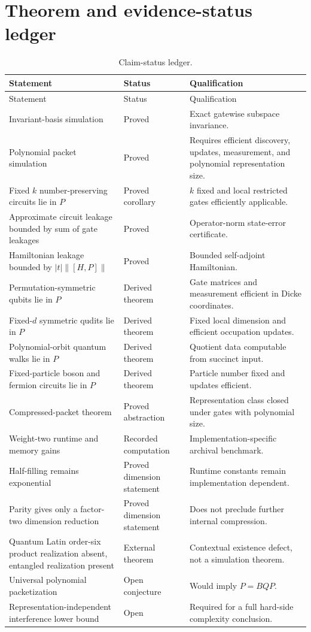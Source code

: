 \chapter{Theorem and evidence-status ledger}
\label{app:status}

\begin{longtable}{@{}L{.31\textwidth}L{.16\textwidth}L{.43\textwidth}@{}}
\caption{Claim-status ledger.}\\
\toprule
Statement & Status & Qualification\\
\midrule
\endfirsthead
\toprule
Statement & Status & Qualification\\
\midrule
\endhead
Invariant-basis simulation & Proved & Exact gatewise subspace invariance.\\
Polynomial packet simulation & Proved & Requires efficient discovery, updates, measurement, and polynomial representation size.\\
Fixed $k$ number-preserving circuits lie in $P$ & Proved corollary & $k$ fixed and local restricted gates efficiently applicable.\\
Approximate circuit leakage bounded by sum of gate leakages & Proved & Operator-norm state-error certificate.\\
Hamiltonian leakage bounded by $|t|\|[H,P]\|$ & Proved & Bounded self-adjoint Hamiltonian.\\
Permutation-symmetric qubits lie in $P$ & Derived theorem & Gate matrices and measurement efficient in Dicke coordinates.\\
Fixed-$d$ symmetric qudits lie in $P$ & Derived theorem & Fixed local dimension and efficient occupation updates.\\
Polynomial-orbit quantum walks lie in $P$ & Derived theorem & Quotient data computable from succinct input.\\
Fixed-particle boson and fermion circuits lie in $P$ & Derived theorem & Particle number fixed and updates efficient.\\
Compressed-packet theorem & Proved abstraction & Representation class closed under gates with polynomial size.\\
Weight-two runtime and memory gains & Recorded computation & Implementation-specific archival benchmark.\\
Half-filling remains exponential & Proved dimension statement & Runtime constants remain implementation dependent.\\
Parity gives only a factor-two dimension reduction & Proved dimension statement & Does not preclude further internal compression.\\
Quantum Latin order-six product realization absent, entangled realization present & External theorem & Contextual existence defect, not a simulation theorem.\\
Universal polynomial packetization & Open conjecture & Would imply $P=BQP$.\\
Representation-independent interference lower bound & Open & Required for a full hard-side complexity conclusion.\\
\bottomrule
\end{longtable}

